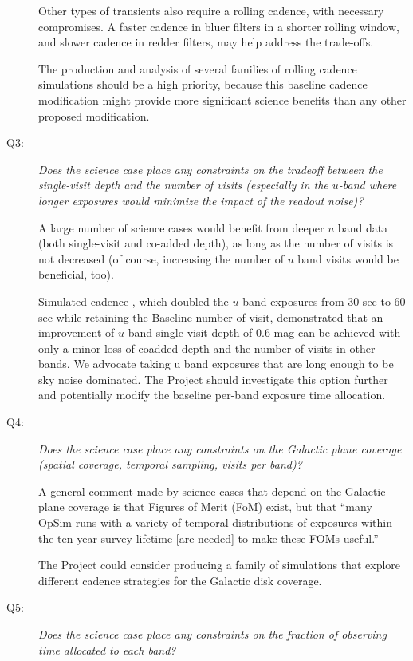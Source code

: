\begin{description}
Other types of transients also require a rolling cadence, with necessary compromises.  A faster cadence in
bluer filters in a shorter rolling window, and slower cadence in redder filters, may help address the
trade-offs.

The production and analysis of several families of rolling cadence
simulations should be a high priority, because this
baseline cadence modification might provide more significant science
benefits than any other proposed modification.


\item[Q3:] {\it Does the science case place any constraints on the
tradeoff between the single-visit depth and the number of visits
(especially in the $u$-band where longer exposures would minimize the
impact of the readout noise)?}


A large number of science cases would benefit from deeper $u$ band data
(both single-visit and co-added depth), as long as the number of visits
is not decreased (of course, increasing the number of $u$ band visits
would be beneficial, too).

Simulated cadence , which
doubled the $u$ band exposures from 30 sec to 60 sec while retaining the Baseline number of visit, demonstrated that an
improvement of $u$ band single-visit depth of 0.6 mag can be achieved
with only a minor loss of coadded depth and the number of visits in other bands.
We advocate taking u band exposures that are long enough to be sky noise dominated.
The Project should investigate this option further and potentially
modify the baseline per-band exposure time allocation.


\item[Q4:] {\it Does the science case place any constraints on the
Galactic plane coverage (spatial coverage, temporal sampling, visits per
band)?}

A general comment made by science cases that depend on the Galactic
plane coverage is that Figures of Merit (FoM) exist, but that ``many
OpSim runs with a variety of temporal distributions of exposures within
the ten-year survey lifetime [are needed] to make these FOMs useful.''

The Project could consider producing a family of simulations that explore
different cadence strategies for the Galactic disk coverage.


\item[Q5:] {\it Does the science case place any constraints on the
fraction of observing time allocated to each band?}


\end{description}
